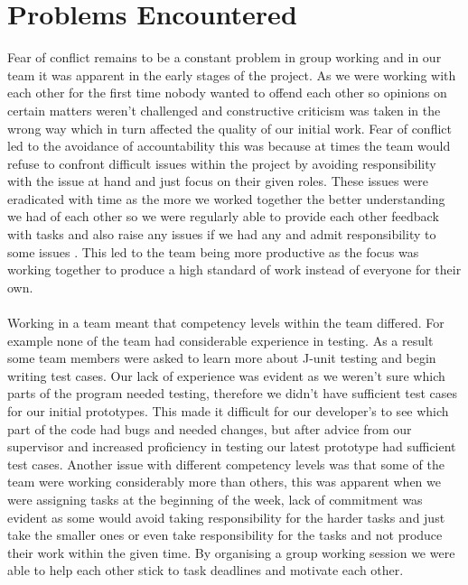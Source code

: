\documentclass[10pt,a4paper]{article}
\begin{document}
\section{Problems Encountered}
Fear of conflict remains to be a constant problem in group working and in our team it was apparent in the early stages of the project. As we were working with each other for the first time nobody wanted to offend each other so opinions on certain matters weren’t challenged and constructive criticism was taken in the wrong way which in turn affected the quality of our initial work. Fear of conflict led to the avoidance of accountability this was because at times the team would refuse to confront difficult issues within the project by avoiding responsibility with the issue at hand and just focus on their given roles. These issues were eradicated with time as the more we worked together the better understanding we had of each other so we were regularly able to provide each other feedback with tasks and also raise any issues if we had any and admit responsibility to some issues . This led to the team being more productive as the focus was working together to produce a high standard of work instead of everyone for their own.\\
\\
Working in a team meant that competency levels within the team differed. For example none of the team had considerable experience in testing. As a result some team members were asked to learn more about J-unit testing and begin writing test cases. Our lack of experience was evident as we weren’t sure which parts of the program needed testing, therefore we didn’t have sufficient test cases for our initial prototypes. This made it difficult for our developer’s to see which part of the code had bugs and needed changes, but after advice from our supervisor and increased proficiency in testing our latest prototype had sufficient test cases. Another issue with different competency levels was that some of the team were working considerably more than others, this was apparent when we were assigning tasks at the beginning of the week, lack of commitment was evident as some would avoid taking responsibility for the harder tasks and just take the smaller ones or even take responsibility for the tasks and not produce their work within the given time. By organising a group working session we were able to help each other stick to task deadlines and motivate each other.\\ 
\\
\end{document}
